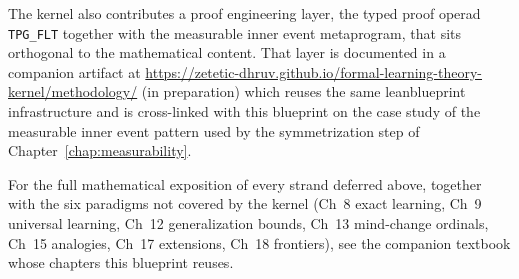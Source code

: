 The kernel also contributes a proof engineering layer, the typed
proof operad \texttt{TPG\_FLT} together with the measurable inner
event metaprogram, that sits orthogonal to the mathematical content.
That layer is documented in a companion artifact at
\url{https://zetetic-dhruv.github.io/formal-learning-theory-kernel/methodology/}
(in preparation) which reuses the same leanblueprint infrastructure
and is cross-linked with this blueprint on the case study of the
measurable inner event pattern used by the symmetrization step of
Chapter~\ref{chap:measurability}.

For the full mathematical exposition of every strand deferred above,
together with the six paradigms not covered by the kernel (Ch~8
exact learning, Ch~9 universal learning, Ch~12 generalization
bounds, Ch~13 mind-change ordinals, Ch~15 analogies, Ch~17 extensions,
Ch~18 frontiers), see the companion textbook whose chapters this
blueprint reuses.
